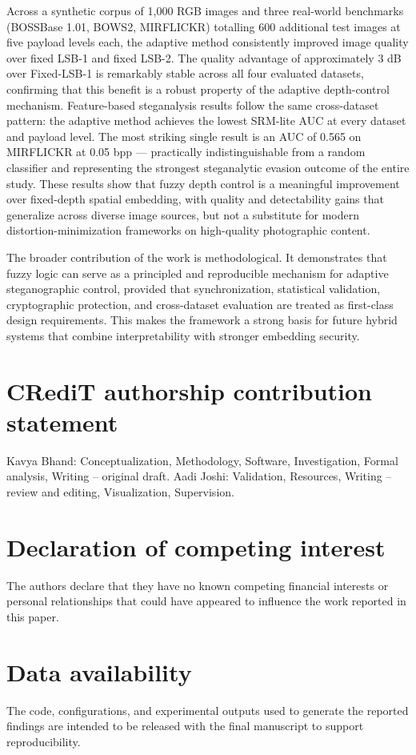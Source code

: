 Across a synthetic corpus of 1,000 RGB images and three real-world benchmarks (BOSSBase 1.01, BOWS2, MIRFLICKR) totalling 600 additional test images at five payload levels each, the adaptive method consistently improved image quality over fixed LSB-1 and fixed LSB-2. The quality advantage of approximately 3 dB over Fixed-LSB-1 is remarkably stable across all four evaluated datasets, confirming that this benefit is a robust property of the adaptive depth-control mechanism. Feature-based steganalysis results follow the same cross-dataset pattern: the adaptive method achieves the lowest SRM-lite AUC at every dataset and payload level. The most striking single result is an AUC of 0.565 on MIRFLICKR at 0.05 bpp --- practically indistinguishable from a random classifier and representing the strongest steganalytic evasion outcome of the entire study. These results show that fuzzy depth control is a meaningful improvement over fixed-depth spatial embedding, with quality and detectability gains that generalize across diverse image sources, but not a substitute for modern distortion-minimization frameworks on high-quality photographic content.

The broader contribution of the work is methodological. It demonstrates that fuzzy logic can serve as a principled and reproducible mechanism for adaptive steganographic control, provided that synchronization, statistical validation, cryptographic protection, and cross-dataset evaluation are treated as first-class design requirements. This makes the framework a strong basis for future hybrid systems that combine interpretability with stronger embedding security.

\section*{CRediT authorship contribution statement}
Kavya Bhand: Conceptualization, Methodology, Software, Investigation, Formal analysis, Writing -- original draft. Aadi Joshi: Validation, Resources, Writing -- review and editing, Visualization, Supervision.

\section*{Declaration of competing interest}
The authors declare that they have no known competing financial interests or personal relationships that could have appeared to influence the work reported in this paper.

\section*{Data availability}
The code, configurations, and experimental outputs used to generate the reported findings are intended to be released with the final manuscript to support reproducibility.





